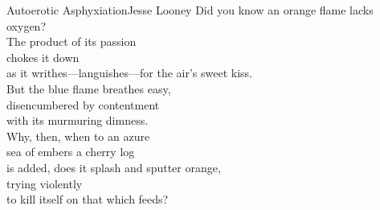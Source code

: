 \begin{poetry}{Autoerotic Asphyxiation}{Jesse Looney}
Did you know an orange flame lacks oxygen?\\
The product of its passion\\
chokes it down\\
as it writhes---languishes---for the air's sweet kiss.\\
But the blue flame breathes easy,\\
disencumbered by contentment\\
with its murmuring dimness.\\
Why, then, when to an azure\\
sea of embers a cherry log\\
is added, does it splash and sputter orange,\\
trying violently\\
to kill itself on that which feeds?
\end{poetry}


